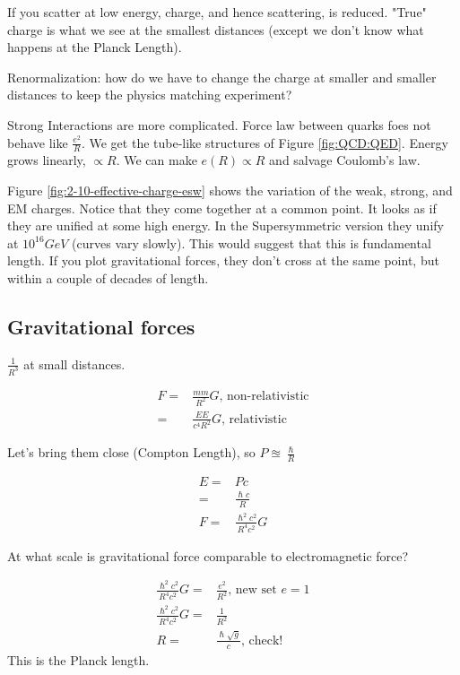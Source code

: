 \documentclass[]{article}
\begin{document}
If you scatter at low energy, charge, and hence scattering, is reduced. "True" charge is what we see at the smallest distances (except we don't know what happens at the Planck Length).

Renormalization: how do we have to change the charge at smaller and smaller distances to keep the physics matching experiment?

Strong Interactions are more complicated. Force law between quarks foes not behave like $\frac{e^2}{R}$. We get the tube-like structures of Figure \ref{fig:QCD:QED}. Energy grows linearly, $\propto R$. We can make $e(R) \propto R$ and salvage Coulomb's law.

Figure \ref{fig:2-10-effective-charge-esw} shows the variation of the weak, strong, and EM charges. Notice that they come together at a common point. It looks as if they are unified at some high energy. In the Supersymmetric version they unify at $10^{16}GeV$ (curves vary slowly). This would suggest that this is fundamental length. If you plot gravitational forces, they don't cross at the same point, but within a couple of decades of length.

\subsection{Gravitational forces}

$\frac{1}{R^3}$ at small distances.

\begin{align*}
	F =& \frac{mm}{R^2}G \text{, non-relativistic}\\
	=& \frac{E E}{c^4 R^2}G \text{,                                              relativistic}
\end{align*}

Let's bring them close (Compton Length), so $P\approxeq\frac{\hslash}{R}$

\begin{align*}
	E =& Pc\\
	=& \frac{\hslash c}{R}\\
	F =& \frac{\hslash^2 c^2}{R^4 c^2}G
\end{align*}

At what scale is gravitational force comparable to electromagnetic force?

\begin{align*}
	\frac{\hslash^2 c^2}{R^4 c^2}G =& \frac{e^2}{R^2} \text{, new set $e=1$}\\
	\frac{\hslash^2 c^2}{R^4 c^2}G =& \frac{1}{R^2} \\
	R =&\frac{\hslash \sqrt{g}}{c}	\text{, check!}
\end{align*}
This is the Planck length.

\printglossaries


\raggedright

\end{document}
